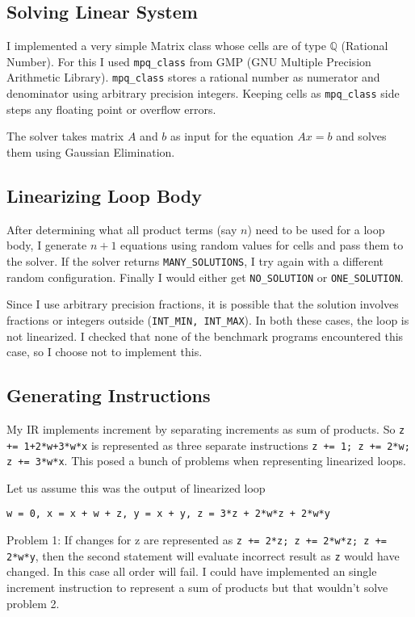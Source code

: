 \documentclass[11pt,answers]{exam}
\begin{document}
\subsection{Solving Linear System}
I implemented a very simple Matrix class whose cells are of type $\mathbb{Q}$ (Rational Number). For this I used \texttt{mpq\_class} from GMP (GNU Multiple Precision Arithmetic Library). \texttt{mpq\_class} stores a rational number as numerator and denominator using arbitrary precision integers. Keeping cells as \texttt{mpq\_class} side steps any floating point or overflow errors.

The solver takes matrix $A$ and $b$ as input for the equation $Ax = b$ and solves them using Gaussian Elimination.

\subsection{Linearizing Loop Body}
After determining what all product terms (say $n$) need to be used for a loop body, I generate $n+1$ equations using random values for cells and pass them to the solver. If the solver returns \texttt{MANY\_SOLUTIONS}, I try again with a different random configuration. Finally I would either get \texttt{NO\_SOLUTION} or \texttt{ONE\_SOLUTION}.

Since I use arbitrary precision fractions, it is possible that the solution involves fractions or integers outside (\texttt{INT\_MIN, INT\_MAX}). In both these cases, the loop is not linearized. I checked that none of the benchmark programs encountered this case, so I choose not to implement this.

\subsection{Generating Instructions}
My IR implements increment by separating increments as sum of products. So \texttt{z += 1+2*w+3*w*x} is represented as three separate instructions \texttt{z += 1; z += 2*w; z += 3*w*x}. This posed a bunch of problems when representing linearized loops.

Let us assume this was the output of linearized loop

\texttt{w = 0, x = x + w + z, y = x + y, z = 3*z + 2*w*z + 2*w*y}

Problem 1: If changes for z are represented as \texttt{z += 2*z; z += 2*w*z; z += 2*w*y}, then the second statement will evaluate incorrect result as \texttt{z} would have changed. In this case all order will fail. I could have implemented an single increment instruction to represent a sum of products but that wouldn't solve problem 2.
\end{document}
